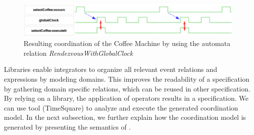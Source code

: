 \begin{figure}
	\center
	\includegraphics[width=.9\textwidth]{bcool/figs/libvcd}
	\caption{Resulting coordination of the Coffee Machine by using the automata relation \emph{RendezvousWithGlobalClock}}
	\label{fig:libvcd}
\end{figure}





Libraries enable integrators to organize all relevant event relations and expressions by modeling domains. This improves the readability of a \bcool specification by gathering domain specific relations, which can be reused in other specification. By relying on a \moccml library, the application of \bcool operators results in a \ccsl specification. We can use \ccsl tool (\eg TimeSquare\cite{timesquarebib}) to analyze and execute the generated coordination model. In the next subsection, we further explain how the coordination model is generated by presenting the semantics of \bcool.   




